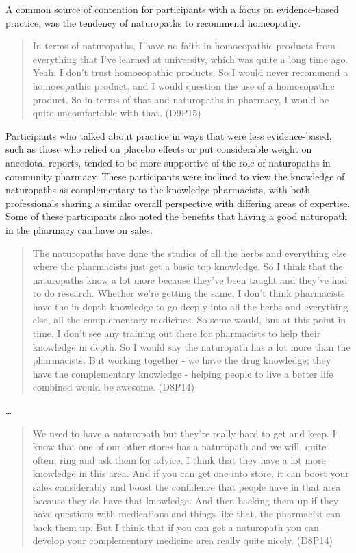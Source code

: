 \documentclass[11pt,a4paper]{article}
\begin{document}
A common source of contention for participants with a focus on
evidence-based practice, was the tendency of naturopaths to recommend
homeopathy.

\begin{quote}
In terms of naturopaths, I have no faith in homoeopathic products from
everything that I've learned at university, which was quite a long time
ago. Yeah. I don't trust homoeopathic products. So I would never
recommend a homoeopathic product, and I would question the use of a
homoeopathic product. So in terms of that and naturopaths in pharmacy, I
would be quite uncomfortable with that. (D9P15)
\end{quote}

Participants who talked about practice in ways that were less
evidence-based, such as those who relied on placebo effects or put
considerable weight on anecdotal reports, tended to be more supportive
of the role of naturopaths in community pharmacy. These participants
were inclined to view the knowledge of naturopaths as complementary to
the knowledge pharmacists, with both professionals sharing a similar
overall perspective with differing areas of expertise. Some of these
participants also noted the benefits that having a good naturopath in
the pharmacy can have on sales.

\begin{quote}
The naturopaths have done the studies of all the herbs and everything
else where the pharmacists just get a basic top knowledge. So I think
that the naturopaths know a lot more because they've been taught and
they've had to do research. Whether we're getting the same, I don't
think pharmacists have the in-depth knowledge to go deeply into all the
herbs and everything else, all the complementary medicines. So some
would, but at this point in time, I don't see any training out there for
pharmacists to help their knowledge in depth. So I would say the
naturopath has a lot more than the pharmacists. But working together -
we have the drug knowledge; they have the complementary knowledge -
helping people to live a better life combined would be awesome. (D8P14)
\end{quote}

\ldots{}

\begin{quote}
We used to have a naturopath but they're really hard to get and keep. I
know that one of our other stores has a naturopath and we will, quite
often, ring and ask them for advice. I think that they have a lot more
knowledge in this area. And if you can get one into store, it can boost
your sales considerably and boost the confidence that people have in
that area because they do have that knowledge. And then backing them up
if they have questions with medications and things like that, the
pharmacist can back them up. But I think that if you can get a
naturopath you can develop your complementary medicine area really quite
nicely. (D8P14)
\end{quote}
\end{document}
